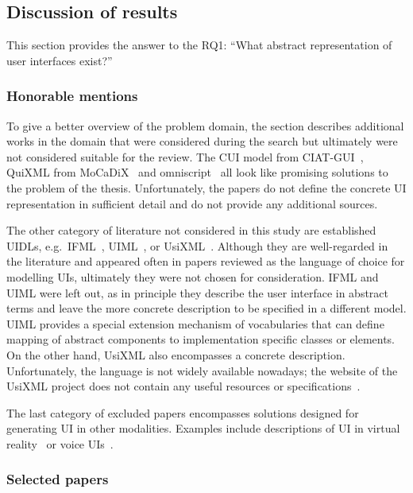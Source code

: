 \subsection{Discussion of results}\label{subsec:review-discussion-of-results}

This section provides the answer to the RQ1: \enquote{What abstract representation of user interfaces exist?}

\subsubsection{Honorable mentions}
To give a better overview of the problem domain, the section describes additional works in the domain that were considered during the search but ultimately were not considered suitable for the review.
The CUI model from CIAT-GUI~\cite{Molina2012-my}, QuiXML from MoCaDiX~\cite{Vanderdonckt2019-av} and omniscript~\cite{Ulusoy2019-jh} all look like promising solutions to the problem of the thesis.
Unfortunately, the papers do not define the concrete UI representation in sufficient detail and do not provide any additional sources.

The other category of literature not considered in this study are established UIDLs, e.g.\ IFML~\cite{Brambilla2014-ln}, UIML~\cite{Abrams1999}, or UsiXML~\cite{Limbourg2005}.
Although they are well-regarded in the literature and appeared often in papers reviewed as the language of choice for modelling UIs, ultimately they were not chosen for consideration.
IFML and UIML were left out, as in principle they describe the user interface in abstract terms and leave the more concrete description to be specified in a different model.
UIML provides a special extension mechanism of vocabularies that can define mapping of abstract components to implementation specific classes or elements.
On the other hand, UsiXML also encompasses a concrete description.
Unfortunately, the language is not widely available nowadays;
the website of the UsiXML project does not contain any useful resources or specifications~.

The last category of excluded papers encompasses solutions designed for generating UI in other modalities.
Examples include descriptions of UI in virtual reality~\cite{Olmedo2015} or voice UIs~\cite{steinberger2020domain}.

\subsubsection{Selected papers}

